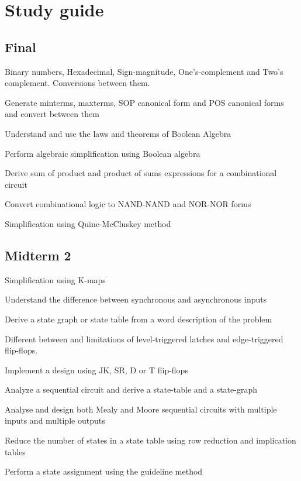 \documentclass[options]{article}
\newcommand{\cmark}{\ding{51}}%
\newcommand{\done}{\rlap{$\square$}{\raisebox{2pt}{\large\hspace{1pt}\cmark}}%
  \hspace{-2.5pt}}
\begin{document}
\section{Study guide}
\subsection{Final}
\begin{todolist}
  \item[\done] Binary numbers, Hexadecimal, Sign-magnitude, One's-complement and
    Two's complement. Conversions between them.
  \item[\done] Generate minterms, maxterms, SOP canonical form and POS
    canonical forms and convert between them\\
  \item[\done]  Understand and use the laws and theorems of Boolean Algebra
  \item[\done]  Perform algebraic simplification using Boolean algebra
  \item[\done]  Derive sum of product and product of sums expressions for a combinational circuit
  \item[\done]  Convert combinational logic to NAND-NAND and NOR-NOR forms
  \item[\done]  Simplification using Quine-McCluskey method
\end{todolist}

\subsection{Midterm 2}
\begin{todolist}
  \item[\done] Simplification using K-maps
  \item[\done] Understand the difference between synchronous and asynchronous inputs
  \item[\done] Derive a state graph or state table from a word description of the problem
\item [\done] Different between and limitations of level-triggered latches and edge-triggered flip-flops.
  \item[\done] Implement a design using JK, SR, D or T flip-flops
  \item[\done] Analyze a sequential circuit and derive a state-table and a state-graph
  \item[\done] Analyse and design both Mealy and Moore sequential circuits with multiple inputs and multiple outputs
  \item[\done] Reduce the number of states in a state table using row reduction and implication tables
  \item[\done] Perform a state assignment using the guideline method
\end{todolist}
\end{document}
